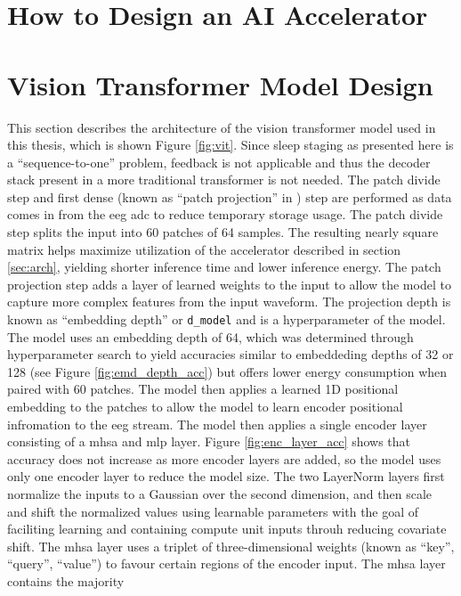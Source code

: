 \documentclass[12pt, hidelinks]{article}
\begin{document}
\newpage
\section{How to Design an AI Accelerator}
\label{sec:methods}


\newpage
\section{Vision Transformer Model Design}
\label{sec:vision_transformer}
This section describes the architecture of the vision transformer model used in this thesis, which is shown Figure \ref{fig:vit}. Since sleep staging as presented
here is a ``sequence-to-one'' problem, feedback is not applicable and thus the decoder stack present in a more traditional transformer is not needed. The patch divide step and
first dense (known as ``patch projection'' in \cite{dosovitskiy2010image}) step are performed as data comes in from the \ac{eeg} \ac{adc} to reduce temporary storage usage. The 
patch divide step splits the input into 60 patches of 64 samples. The resulting nearly square matrix helps maximize utilization of the accelerator described in section \ref{sec:arch},
yielding shorter inference time and lower inference energy. The patch projection step adds a layer of learned weights to the input to allow the model to capture more complex features
from the input waveform. The projection depth is known as ``embedding depth'' or \texttt{d\_model} and is a hyperparameter of the model. The model uses an embedding depth of 64,
which was determined through hyperparameter search to yield accuracies similar to embeddeding depths of 32 or 128 (see Figure \ref{fig:emd_depth_acc}) but offers lower energy
consumption when paired with 60 patches. The model then applies a learned 1D positional embedding to the patches to allow the model to learn encoder positional infromation to the \ac{eeg}
stream. The model then applies a single encoder layer consisting of a \ac{mhsa} and \ac{mlp} layer. Figure \ref{fig:enc_layer_acc} shows that accuracy does not increase as more 
encoder layers are added, so the model uses only one encoder layer to reduce the model size. The two LayerNorm layers first normalize the inputs to a Gaussian over the second dimension,
and then scale and shift the normalized values using learnable parameters with the goal of faciliting learning and containing compute unit inputs throuh reducing covariate shift. The
\ac{mhsa} layer uses a triplet of three-dimensional weights (known as ``key'', ``query'', ``value'') to favour certain regions of the encoder input. The \ac{mhsa} layer contains the majority
\end{document}
